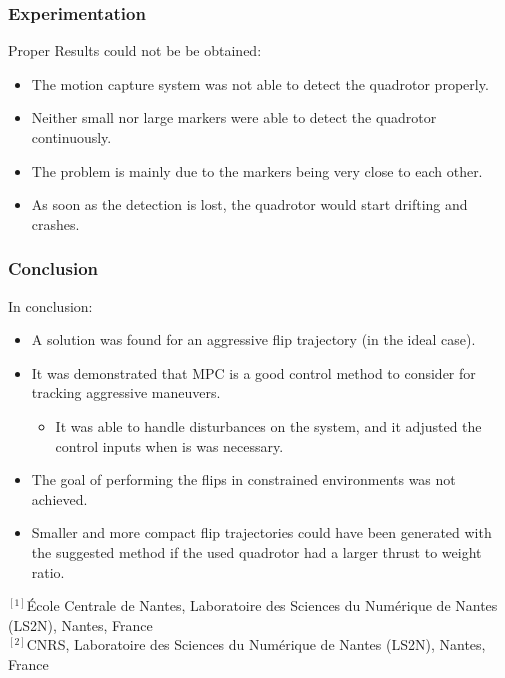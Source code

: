 \documentclass{thesisbeamer}
\newcommand\Fontvi{\fontsize{9}{10}\selectfont}
\begin{document}
\begin{frame}
	\frametitle{Experimentation}
	\Fontvi

	Proper Results could not be be obtained:
	\begin{itemize}
		\item The motion capture system was not able to detect the quadrotor properly.
		\item Neither small nor large markers were able to detect the quadrotor continuously.
		\item The problem is mainly due to the markers being very close to each other.
		\item As soon as the detection is lost, the quadrotor would start drifting and crashes.
	\end{itemize}
	
\end{frame}

\begin{frame}
	\frametitle{Conclusion}
	\Fontvi

	In conclusion:
	\begin{itemize}
		\item A solution was found for an aggressive flip trajectory (in the ideal case).
		\item It was demonstrated that MPC is a good control method to consider for tracking aggressive maneuvers.
		\begin{itemize}
			\item \fontsize{9pt}{10pt}\selectfont It was able to handle disturbances on the system, and it adjusted the control inputs when is was necessary.
		\end{itemize}
		\item The goal of performing the flips in constrained environments was not achieved.
		\item Smaller and more compact flip trajectories could have been generated with the suggested method if the used quadrotor had a larger thrust to weight ratio.
	\end{itemize}
	
\end{frame}

\begin{frame}
	\Fontvi
	\vspace{1cm}
	\vspace{1cm}
	\vspace{1cm}
	\footnotesize{
		$^{[1]}$École Centrale de Nantes, Laboratoire des Sciences du Numérique de Nantes (LS2N), Nantes, France \\
		$^{[2]}$CNRS, Laboratoire des Sciences du Numérique de Nantes (LS2N), Nantes, France}
\end{frame}
\end{document}
